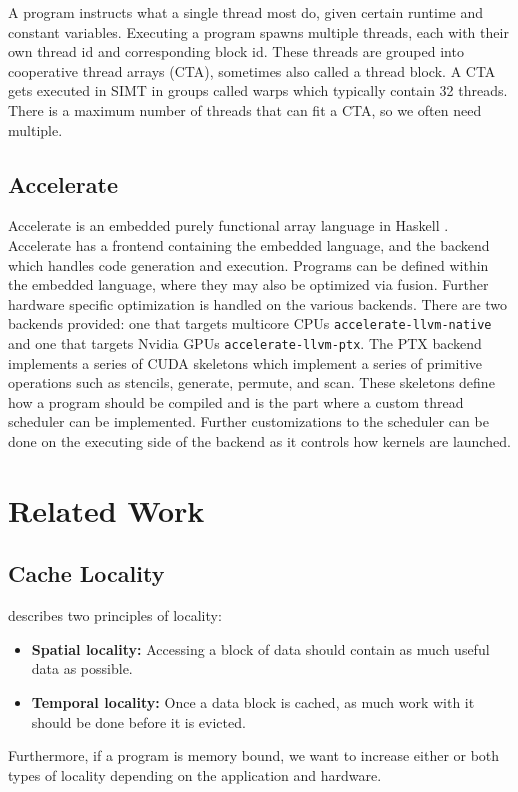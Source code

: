 \documentclass{article}
\begin{document}
A program instructs what a single thread most do, given certain runtime and constant variables.
Executing a program spawns multiple threads, each with their own thread id and corresponding block id.
These threads are grouped into cooperative thread arrays (CTA), sometimes also called a thread block.
A CTA gets executed in SIMT in groups called warps which typically contain 32 threads.
There is a maximum number of threads that can fit a CTA, so we often need multiple.


\subsection{Accelerate}
Accelerate is an embedded purely functional array language in Haskell \cite{chakravarty2011accelerating}.
Accelerate has a frontend containing the embedded language, and the backend which handles code generation and execution.
Programs can be defined within the embedded language, where they may also be optimized via fusion.
Further hardware specific optimization is handled on the various backends.
There are two backends provided: one that targets multicore CPUs \texttt{accelerate-llvm-native} and one that targets Nvidia GPUs \texttt{accelerate-llvm-ptx}.
The PTX backend implements a series of CUDA skeletons which implement a series of primitive operations such as stencils, generate, permute, and scan.
These skeletons define how a program should be compiled and is the part where a custom thread scheduler can be implemented.
Further customizations to the scheduler can be done on the executing side of the backend as it controls how kernels are launched.

\section{Related Work}

\subsection{Cache Locality}
\citet{meyer2003algorithms} describes two principles of locality:
\begin{itemize}
    \item \textbf{Spatial locality:} Accessing a block of data should contain as much useful data as possible.
    \item \textbf{Temporal locality:} Once a data block is cached, as much work with it should be done before it is evicted.
\end{itemize}
Furthermore, if a program is memory bound, we want to increase either or both types of locality depending on the application and hardware.
\end{document}
